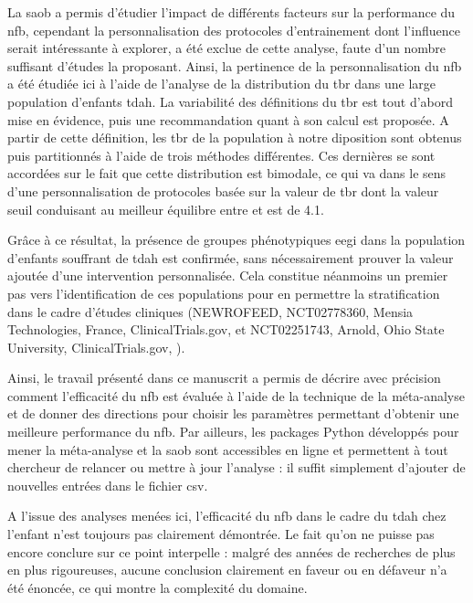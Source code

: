 La \gls{saob} a permis d'étudier l'impact de différents facteurs sur la performance du \gls{nfb}, cependant la personnalisation 
des protocoles d'entrainement dont l'influence serait intéressante 
à explorer, a été exclue de cette analyse, faute d'un nombre suffisant d'études la proposant. Ainsi, la pertinence de la personnalisation 
du \gls{nfb} a été étudiée ici à l'aide de l'analyse de la distribution 
du \gls{tbr} dans une large population d'enfants \gls{tdah}. La variabilité des définitions du \gls{tbr} est tout d'abord mise en 
évidence, puis une recommandation quant à son calcul est proposée. A partir de cette définition, les \gls{tbr} de la population à notre diposition
sont obtenus puis partitionnés à l'aide de trois méthodes différentes. Ces dernières se sont accordées sur le fait que cette distribution 
est bimodale, ce qui va dans 
le sens d'une personnalisation de protocoles basée sur la valeur de \gls{tbr} dont la valeur seuil conduisant au meilleur équilibre entre 
 et  est de 4.1. 

Grâce à ce résultat, la présence de 
groupes phénotypiques \gls{eegi} dans la population d'enfants souffrant de \gls{tdah} est confirmée, sans nécessairement prouver la valeur ajoutée d'une 
intervention personnalisée. Cela constitue néanmoins un premier pas vers l'identification de ces populations pour en 
permettre la stratification dans le cadre d'études cliniques (NEWROFEED, NCT02778360, Mensia Technologies, France, ClinicalTrials.gov, \citet{Bioulac2019} et NCT02251743, Arnold, Ohio State University, 
ClinicalTrials.gov, \citet{Kerson2013}).

Ainsi, le travail présenté dans ce manuscrit a permis de décrire avec précision comment l'efficacité du \gls{nfb} est évaluée à l'aide de 
la technique de la méta-analyse et de donner des 
directions pour choisir les paramètres permettant d'obtenir une meilleure performance du \gls{nfb}. Par ailleurs, les packages Python développés pour mener 
la méta-analyse et la \gls{saob}
sont accessibles en ligne et permettent à tout chercheur de relancer ou mettre à jour l'analyse : il suffit simplement d'ajouter de nouvelles 
entrées dans le fichier \gls{csv}.

A l'issue des analyses menées ici, l'efficacité du \gls{nfb} dans le cadre du \gls{tdah} chez l'enfant n'est toujours pas clairement démontrée. 
Le fait qu'on ne puisse pas encore conclure sur ce point interpelle : malgré des années de recherches de plus en plus rigoureuses, aucune conclusion
clairement en faveur ou en défaveur n'a été énoncée, ce qui montre la complexité du domaine.   

